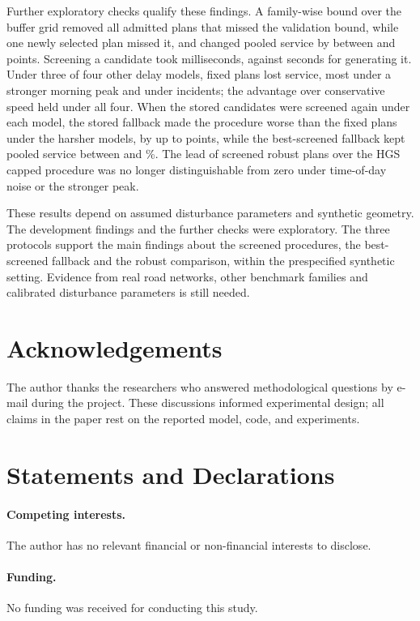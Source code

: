 \documentclass[11pt,a4paper]{article}
\begin{document}
Further exploratory checks qualify these findings. A family-wise bound over the
buffer grid removed all \FwMissOrig{} admitted plans that missed the validation
bound, while one newly selected plan missed it, and changed pooled service by
between \FwPooledChangeMin{} and \FwPooledChangeMax{} points. Screening a
candidate took milliseconds, against seconds for generating it. Under three of
four other delay models, fixed plans lost service, most under a stronger morning
peak and under incidents; the advantage over conservative speed held under all
four. When the stored candidates were screened again under each model, the stored
fallback made the procedure worse than the fixed plans under the harsher models,
by up to \ResWorstDrop{} points, while the best-screened fallback kept pooled
service between \ResLoOrt{} and \ResHiHgs\%. The lead of screened robust plans
over the HGS capped procedure was no longer distinguishable from zero under
time-of-day noise or the stronger peak.

These results depend on assumed disturbance parameters and synthetic geometry.
The development findings and the further checks were exploratory. The three
protocols support the main findings about the screened procedures, the
best-screened fallback and the robust comparison, within the prespecified
synthetic setting. Evidence from real road networks, other benchmark families
and calibrated disturbance parameters is still needed.

\section*{Acknowledgements}
The author thanks the researchers who answered methodological questions by
e-mail during the project.
These discussions informed experimental design; all claims in the paper rest
on the reported model, code, and experiments.

\section*{Statements and Declarations}

\paragraph{Competing interests.} The author has no relevant financial or non-financial interests to disclose.

\paragraph{Funding.} No funding was received for conducting this study.
\end{document}
